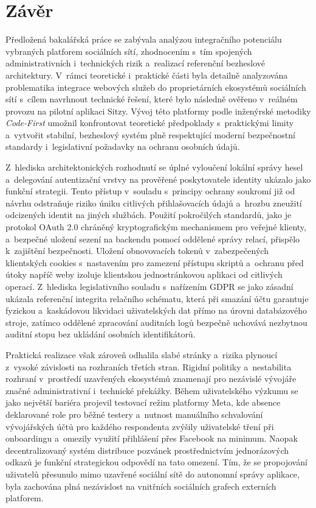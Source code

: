 \documentclass[male,czech,api_bc]{kitheses}
\begin{document}
\chapter{Závěr}

Předložená bakalářská práce se zabývala analýzou integračního potenciálu vybraných platforem sociálních sítí, zhodnocením s~tím spojených administrativních i~technických rizik a~realizací referenční bezheslové architektury. V~rámci teoretické i~praktické části byla detailně analyzována problematika integrace webových služeb do proprietárních ekosystémů sociálních sítí s~cílem navrhnout technické řešení, které bylo následně ověřeno v~reálném provozu na pilotní aplikaci Sitzy. Vývoj této platformy podle inženýrské metodiky \textit{Code-First} umožnil konfrontovat teoretické předpoklady s~praktickými limity a~vytvořit stabilní, bezheslový systém plně respektující moderní bezpečnostní standardy i~legislativní požadavky na ochranu osobních údajů.

Z~hlediska architektonických rozhodnutí se úplné vyloučení lokální správy hesel a~delegování autentizační vrstvy na prověřené poskytovatele identity ukázalo jako funkční strategii. Tento přístup v~souladu s~principy ochrany soukromí již od návrhu odstraňuje riziko úniku citlivých přihlašovacích údajů a~hrozbu zneužití odcizených identit na jiných službách. Použití pokročilých standardů, jako je protokol OAuth 2.0 chráněný kryptografickým mechanismem pro veřejné klienty, a~bezpečné uložení sezení na backendu pomocí oddělené správy relací, přispělo k~zajištění bezpečnosti. Uložení obnovovacích tokenů v~zabezpečených klientských cookies s~nastavením pro zamezení přístupu skriptů a~ochranu před útoky napříč weby izoluje klientskou jednostránkovou aplikaci od citlivých operací. Z~hlediska legislativního souladu s~nařízením GDPR se jako zásadní ukázala referenční integrita relačního schématu, která při smazání účtu garantuje fyzickou a~kaskádovou likvidaci uživatelských dat přímo na úrovni databázového stroje, zatímco oddělené zpracování auditních logů bezpečně uchovává nezbytnou auditní stopu bez ukládání osobních identifikátorů.

Praktická realizace však zároveň odhalila slabé stránky a~rizika plynoucí z~vysoké závislosti na rozhraních třetích stran. Rigidní politiky a~nestabilita rozhraní v~prostředí uzavřených ekosystémů znamenají pro nezávislé vývojáře značné administrativní i~technické překážky. Během uživatelského výzkumu se jako největší bariéra projevil testovací režim platformy Meta, kde absence deklarované role pro běžné testery a~nutnost manuálního schvalování vývojářských účtů pro každého respondenta zvýšily uživatelské tření při onboardingu a~omezily využití přihlášení přes Facebook na minimum. Naopak decentralizovaný systém distribuce pozvánek prostřednictvím jednorázových odkazů je funkční strategickou odpovědí na tato omezení. Tím, že se propojování uživatelů přesunulo mimo uzavřené sociální sítě do autonomní správy aplikace, byla zachována plná nezávislost na vnitřních sociálních grafech externích platforem.\\
\end{document}
